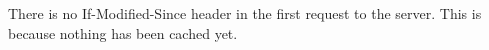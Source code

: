 There is no If-Modified-Since header in the first request to the server. This is because nothing has been cached yet.